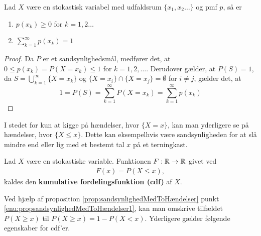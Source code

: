 
\begin{prop}\label{prop:kravTilPMF}\label{prop:pmfEgenskaber} %
Lad $X$ være en stokastisk variabel med udfaldsrum $\{x_1, x_2\ldots\}$ og pmf $p$, så er 
\begin{enumerate}
    \item $p(x_k) \geq 0$ for $k=1,2 \ldots$
    \item $\displaystyle \sum_{k=1}^{\infty} p(x_k) = 1 $
\end{enumerate}
\end{prop}
\begin{proof}
Da $P$ er et sandsynlighedsmål, medfører det, at $0 \leq p(x_k) = P(X = x_k) \leq 1 \text{ for } k=1,2,\ldots$. Derudover gælder, at $P(S)=1$, da $S = \bigcup^\infty_{k = 1} \{X=x_k\}$ og $\{X=x_i\} \cap \{X=x_j\} = \emptyset$ for $i \neq j$, gælder det, at
\begin{equation*}
    1 = P(S) = \sum^\infty_{k = 1} P(X=x_k) = \sum_{k=1}^\infty p(x_k)
\end{equation*}
\end{proof}
I stedet for kun at kigge på hændelser, hvor $\{ X=x \}$, kan man yderligere se på hændelser, hvor $\{X \leq x \}$. Dette kan eksempelhvis være sandsynligheden for at slå mindre end eller lig med et bestemt tal $x$ på et terningkast. 
\begin{defn} %
Lad $X$ være en stokastiske variable. Funktionen $F: \mathbb{R} \to \mathbb{R}$ givet ved
\begin{align*}
    F(x)=P(X\leq x), 
\end{align*}
kaldes den \textbf{kumulative fordelingsfunktion (cdf)} af $X$.
\end{defn}
Ved hjælp af proposition \ref{prop:sandsynlighedMedToHændelser} punkt \ref{enu:propsandsynlighedMedToHændelser1}, kan man omskrive tilfældet $P(X\geq x)$ til $P(X\geq x)=1-P(X<x)$. Yderligere gælder følgende egenskaber for cdf'er. 

